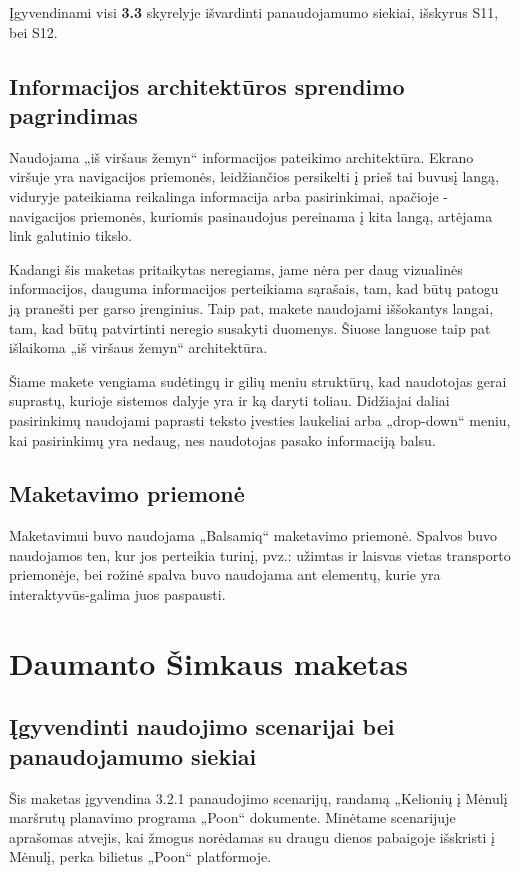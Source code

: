 \documentclass{VUMIFPSkursinis}
\begin{document}
Įgyvendinami visi \textbf{3.3} skyrelyje išvardinti panaudojamumo siekiai, išskyrus S11, bei S12.

\subsection{Informacijos architektūros sprendimo pagrindimas}
Naudojama „iš viršaus žemyn“ informacijos pateikimo architektūra. Ekrano viršuje yra navigacijos priemonės, leidžiančios persikelti į prieš tai buvusį langą, viduryje pateikiama reikalinga informacija arba pasirinkimai, apačioje - navigacijos priemonės, kuriomis pasinaudojus pereinama į kita langą, artėjama link galutinio tikslo.

Kadangi šis maketas pritaikytas neregiams, jame nėra per daug vizualinės informacijos, dauguma informacijos perteikiama sąrašais, tam, kad būtų patogu ją pranešti per garso įrenginius. Taip pat, makete naudojami iššokantys langai, tam, kad būtų patvirtinti neregio susakyti duomenys. Šiuose languose taip pat išlaikoma  „iš viršaus žemyn“ architektūra.

Šiame makete vengiama sudėtingų ir gilių meniu struktūrų, kad naudotojas gerai suprastų, kurioje sistemos dalyje yra ir ką daryti toliau. Didžiajai daliai pasirinkimų naudojami paprasti teksto įvesties laukeliai arba „drop-down“ meniu, kai pasirinkimų yra nedaug, nes naudotojas pasako informaciją balsu.

\subsection{Maketavimo priemonė}
Maketavimui buvo naudojama „Balsamiq“ maketavimo priemonė. Spalvos buvo naudojamos ten, kur jos perteikia turinį, pvz.: užimtas ir laisvas vietas transporto priemonėje, bei rožinė spalva buvo naudojama ant elementų, kurie yra interaktyvūs-galima juos paspausti.

\section{Daumanto Šimkaus maketas}
\subsection{Įgyvendinti naudojimo scenarijai bei panaudojamumo siekiai}
Šis maketas įgyvendina 3.2.1 panaudojimo scenarijų, randamą „Kelionių į Mėnulį maršrutų planavimo programa „Poon“ dokumente. Minėtame scenarijuje aprašomas atvejis, kai žmogus norėdamas su draugu dienos pabaigoje išskristi į Mėnulį, perka bilietus „Poon“ platformoje.
\end{document}
